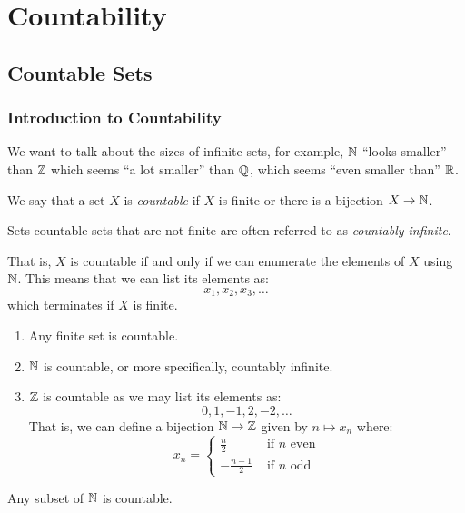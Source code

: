 \documentclass[../main.tex]{subfiles}
\begin{document}
\chapter{Countability}
\section{Countable Sets}
\subsection{Introduction to Countability}
We want to talk about the sizes of infinite sets, for example, $\mathbb{N}$ ``looks smaller'' than $\mathbb{Z}$ which seems ``a lot smaller'' than $\mathbb{Q}$, which seems ``even smaller than'' $\mathbb{R}$.
\begin{definition}
  We say that a set $X$ is \textit{countable} if $X$ is finite or there is a bijection $X \to \mathbb{N}$. \label{countableDef}

  Sets countable sets that are not finite are often referred to as \textit{countably infinite}.
\end{definition}
That is, $X$ is countable if and only if we can enumerate the elements of $X$ using $\mathbb{N}$.
This means that we can list its elements as:
\[
  x_1, x_2, x_3, \ldots
\]
which terminates if $X$ is finite.
\begin{example}
  \begin{enumerate}
    \item Any finite set is countable.
    \item $\mathbb{N}$ is countable, or more specifically, countably infinite.
    \item $\mathbb{Z}$ is countable as we may list its elements as:
      \[
        0, 1, -1, 2, -2, \ldots
      \]
      That is, we can define a bijection $\mathbb{N} \to \mathbb{Z}$ given by $n \mapsto x_n$ where:
      \[
        x_n = \begin{cases}
        \frac{n}{2} & \text{ if $n$ even} \\
        -\frac{n - 1}{2} & \text{ if $n$ odd}
        \end{cases}
      \]
  \end{enumerate}
\end{example}
\begin{lemma}
  Any subset of $\mathbb{N}$ is countable. \label{countableSubset}
\end{lemma}
\end{document}
